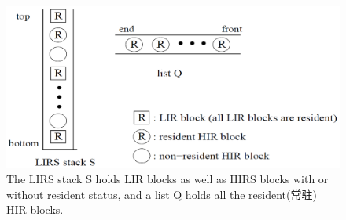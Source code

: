 \begin{figure}[H]
\centering
\includegraphics[keepaspectratio, scale=0.4]{pitures/lirsstack.png}
\caption{ The LIRS stack S holds LIR blocks as well as HIRS blocks with or without
resident status, and a list Q holds all the resident(常驻) HIR blocks. } 
\end{figure}


